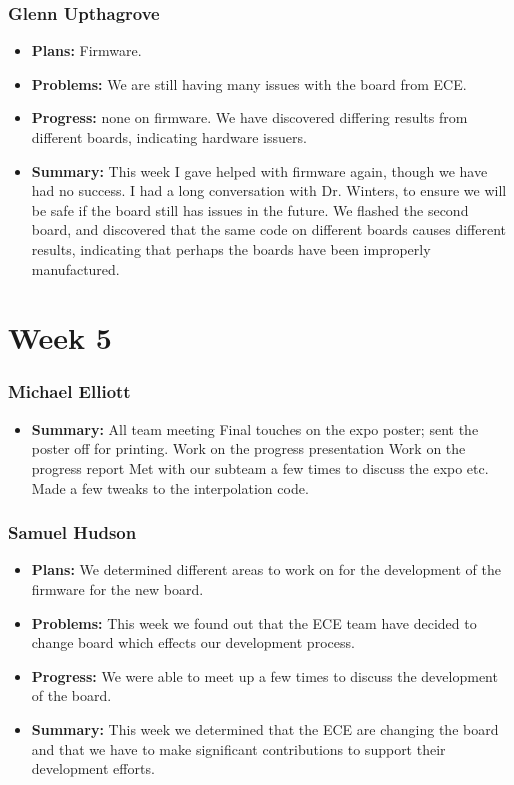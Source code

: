 \documentclass[onecolumn, draftclsnofoot,10pt, compsoc]{IEEEtran}
\begin{document}
\subsubsection{Glenn Upthagrove}
\begin {itemize}
 \item \textbf{Plans: }Firmware.
 \item \textbf{Problems: }We are still having many issues with the board from ECE.    
 \item \textbf{Progress: }none on firmware. We have discovered differing results from different boards, indicating hardware issuers.    
 \item \textbf{Summary: }This week I gave helped with firmware again, though we have had no success. I had a long conversation with Dr. Winters, to ensure we will be safe if the board still has issues in the future. We flashed the second board, and discovered that the same code on different boards causes different results, indicating that perhaps the boards have been improperly manufactured.    
\end {itemize}

\section{Week 5}
\subsubsection{Michael Elliott}
\begin {itemize}
 \item \textbf{Summary: }All team meeting
Final touches on the expo poster; sent the poster off for printing.
Work on the progress presentation
Work on the progress report
Met with our subteam a few times to discuss the expo etc.
Made a few tweaks to the interpolation code.
\end{itemize}
\subsubsection{Samuel Hudson}
\begin {itemize}
 \item \textbf{Plans: }We determined different areas to work on for the development of the firmware for the new board. 
 \item \textbf{Problems: }This week we found out that the ECE team have decided to change board which effects our development process. 
 \item \textbf{Progress: }We were able to meet up a few times to discuss the development of the board.
 \item \textbf{Summary: }This week we determined that the ECE are changing the board and that we have to make significant contributions to support their development efforts.
\end {itemize}
\end{document}
